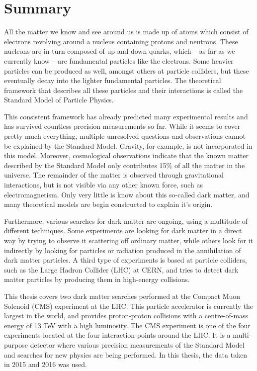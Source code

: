 
\chapter*{Summary}

All the matter we know and see around us is made up of atoms which consist of electrons revolving around a nucleus containing protons and neutrons.  These nucleons are in turn composed of up and down quarks, which – as far as we currently know – are fundamental particles like the electrons. Some heavier particles can be produced as well, amongst others at particle colliders, but these eventually decay into the lighter fundamental particles. The theoretical framework that describes all these particles and their interactions is called the Standard Model of Particle Physics.

This consistent framework has already predicted many experimental results and has survived countless precision measurements so far. While it seems to cover pretty much everything, multiple unresolved questions and observations cannot be explained by the Standard Model. Gravity, for example, is not incorporated in this model. Moreover, cosmological observations indicate that the known matter described by the Standard Model only contributes 15\% of all the matter in the universe. The remainder of the matter is observed through gravitational interactions, but is not visible via any other known force, such as electromagnetism. Only very little is know about this so-called dark matter, and many theoretical models are begin constructed to explain it’s origin. 

Furthermore, various searches for dark matter are ongoing, using a multitude of different techniques. Some experiments are looking for dark matter in a direct way by trying to observe it scattering off ordinary matter, while others look for it indirectly by looking for particles or radiation produced in the annihilation of dark matter particles. A third type of experiments is based at particle colliders, such as the Large Hadron Collider (LHC) at CERN, and tries to detect dark matter particles by producing them in high-energy collisions.

This thesis covers two dark matter searches performed at the Compact Muon Solenoid (CMS) experiment at the LHC. This particle accelerator is currently the largest in the world, and provides proton-proton collisions with a centre-of-mass energy of 13 TeV with a high luminosity. The CMS experiment is one of the four experiments located at the four interaction points around the LHC. It is a multi-purpose detector where various precision measurements of the Standard Model and searches for new physics are being performed. In this thesis, the data taken in 2015 and 2016 was used.

